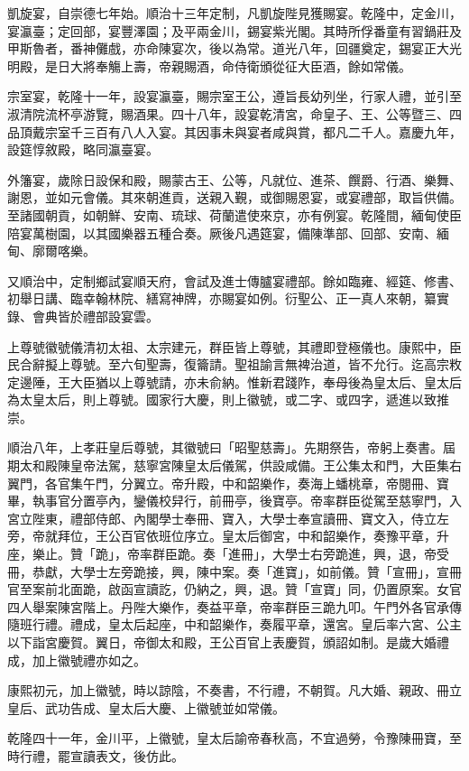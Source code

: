 \begin{pinyinscope}
凱旋宴，自崇德七年始。順治十三年定制，凡凱旋陛見獲賜宴。乾隆中，定金川，宴瀛臺；定回部，宴豐澤園；及平兩金川，錫宴紫光閣。其時所俘番童有習鍋莊及甲斯魯者，番神儺戲，亦命陳宴次，後以為常。道光八年，回疆奠定，錫宴正大光明殿，是日大將奉觴上壽，帝親賜酒，命侍衛頒從征大臣酒，餘如常儀。

宗室宴，乾隆十一年，設宴瀛臺，賜宗室王公，遵旨長幼列坐，行家人禮，並引至淑清院流杯亭游覽，賜酒果。四十八年，設宴乾清宮，命皇子、王、公等暨三、四品頂戴宗室千三百有八人入宴。其因事未與宴者咸與賞，都凡二千人。嘉慶九年，設筵惇敘殿，略同瀛臺宴。

外籓宴，歲除日設保和殿，賜蒙古王、公等，凡就位、進茶、饌爵、行酒、樂舞、謝恩，並如元會儀。其來朝進貢，送親入覲，或御賜恩宴，或宴禮部，取旨供備。至諸國朝貢，如朝鮮、安南、琉球、荷蘭遣使來京，亦有例宴。乾隆間，緬甸使臣陪宴萬樹園，以其國樂器五種合奏。厥後凡遇筵宴，備陳準部、回部、安南、緬甸、廓爾喀樂。

又順治中，定制鄉試宴順天府，會試及進士傳臚宴禮部。餘如臨雍、經筵、修書、初舉日講、臨幸翰林院、繕寫神牌，亦賜宴如例。衍聖公、正一真人來朝，纂實錄、會典皆於禮部設宴雲。

上尊號徽號儀清初太祖、太宗建元，群臣皆上尊號，其禮即登極儀也。康熙中，臣民合辭擬上尊號。至六旬聖壽，復籥請。聖祖諭言無裨治道，皆不允行。迄高宗敉定邊陲，王大臣猶以上尊號請，亦未俞納。惟新君踐阼，奉母後為皇太后、皇太后為太皇太后，則上尊號。國家行大慶，則上徽號，或二字、或四字，遞進以致推崇。

順治八年，上孝莊皇后尊號，其徽號曰「昭聖慈壽」。先期祭告，帝躬上奏書。屆期太和殿陳皇帝法駕，慈寧宮陳皇太后儀駕，供設咸備。王公集太和門，大臣集右翼門，各官集午門，分翼立。帝升殿，中和韶樂作，奏海上蟠桃章，帝閱冊、寶畢，執事官分置亭內，鑾儀校舁行，前冊亭，後寶亭。帝率群臣從駕至慈寧門，入宮立陛東，禮部侍郎、內閣學士奉冊、寶入，大學士奉宣讀冊、寶文入，侍立左旁，帝就拜位，王公百官依班位序立。皇太后御宮，中和韶樂作，奏豫平章，升座，樂止。贊「跪」，帝率群臣跪。奏「進冊」，大學士右旁跪進，興，退，帝受冊，恭獻，大學士左旁跪接，興，陳中案。奏「進寶」，如前儀。贊「宣冊」，宣冊官至案前北面跪，啟函宣讀訖，仍納之，興，退。贊「宣寶」同，仍置原案。女官四人舉案陳宮階上。丹陛大樂作，奏益平章，帝率群臣三跪九叩。午門外各官承傳隨班行禮。禮成，皇太后起座，中和韶樂作，奏履平章，還宮。皇后率六宮、公主以下詣宮慶賀。翼日，帝御太和殿，王公百官上表慶賀，頒詔如制。是歲大婚禮成，加上徽號禮亦如之。

康熙初元，加上徽號，時以諒陰，不奏書，不行禮，不朝賀。凡大婚、親政、冊立皇后、武功告成、皇太后大慶、上徽號並如常儀。

乾隆四十一年，金川平，上徽號，皇太后諭帝春秋高，不宜過勞，令豫陳冊寶，至時行禮，罷宣讀表文，後仿此。


\end{pinyinscope}
